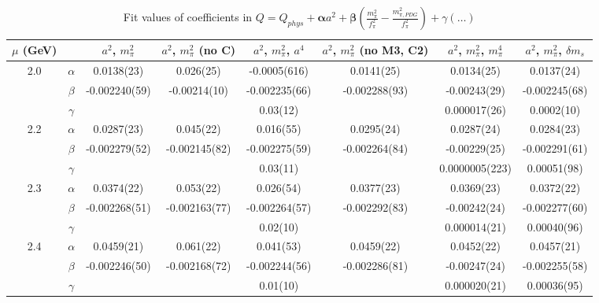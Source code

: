 \documentclass[12pt]{extarticle}
\begin{document}
\begin{table}[h!]
\begin{center}
\begin{tabular}{|c c|c|c|c|c|c|c|}
\hline
$\mu$ (GeV) &  & $a^2$, $m_\pi^2$& $a^2$, $m_\pi^2$ (no C)& $a^2$, $m_\pi^2$, $a^4$& $a^2$, $m_\pi^2$ (no M3, C2)& $a^2$, $m_\pi^2$, $m_\pi^4$& $a^2$, $m_\pi^2$, $\delta m_s$\\
\hline
\multirow{3}{0.5in}{2.0} & $\alpha$ & 0.0138(23)& 0.026(25)& -0.0005(616)& 0.0141(25)& 0.0134(25)& 0.0137(24)\\
 & $\beta$ & -0.002240(59)& -0.00214(10)& -0.002235(66)& -0.002288(93)& -0.00243(29)& -0.002245(68)\\
 & $\gamma$ &  &  & 0.03(12)&  & 0.000017(26)& 0.0002(10)\\
\hline
\multirow{3}{0.5in}{2.2} & $\alpha$ & 0.0287(23)& 0.045(22)& 0.016(55)& 0.0295(24)& 0.0287(24)& 0.0284(23)\\
 & $\beta$ & -0.002279(52)& -0.002145(82)& -0.002275(59)& -0.002264(84)& -0.00229(25)& -0.002291(61)\\
 & $\gamma$ &  &  & 0.03(11)&  & 0.0000005(223)& 0.00051(98)\\
\hline
\multirow{3}{0.5in}{2.3} & $\alpha$ & 0.0374(22)& 0.053(22)& 0.026(54)& 0.0377(23)& 0.0369(23)& 0.0372(22)\\
 & $\beta$ & -0.002268(51)& -0.002163(77)& -0.002264(57)& -0.002292(83)& -0.00242(24)& -0.002277(60)\\
 & $\gamma$ &  &  & 0.02(10)&  & 0.000014(21)& 0.00040(96)\\
\hline
\multirow{3}{0.5in}{2.4} & $\alpha$ & 0.0459(21)& 0.061(22)& 0.041(53)& 0.0459(22)& 0.0452(22)& 0.0457(21)\\
 & $\beta$ & -0.002246(50)& -0.002168(72)& -0.002244(56)& -0.002286(81)& -0.00247(24)& -0.002255(58)\\
 & $\gamma$ &  &  & 0.01(10)&  & 0.000020(21)& 0.00036(95)\\
\hline
\end{tabular}
\caption{Fit values of coefficients in $Q = Q_{phys} + \mathbf{\alpha} a^2 + \mathbf{\beta}\left(\frac{m_\pi^2}{f_\pi^2}-\frac{m_{\pi,PDG}^2}{f_\pi^2}\right) + \gamma(\ldots)$}
\end{center}
\end{table}





\end{document}
